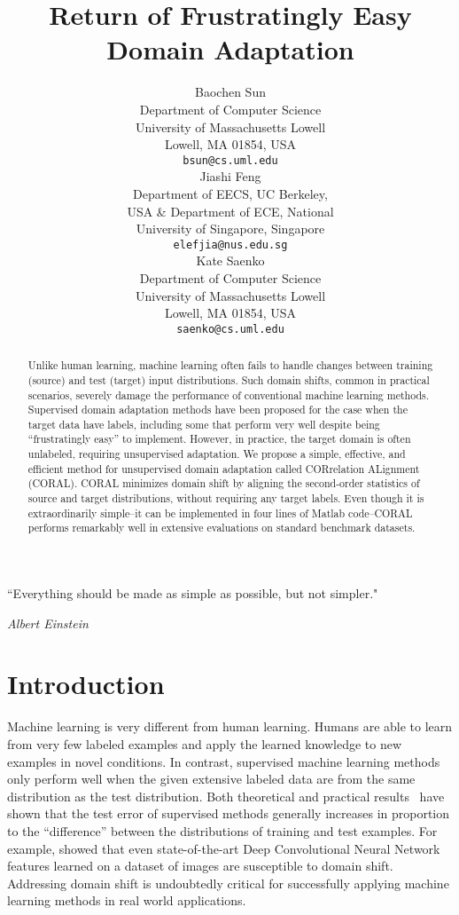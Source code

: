 \documentclass[letterpaper]{article}
\title{Return of Frustratingly Easy Domain Adaptation}
\author{
Baochen Sun\\
Department of Computer Science\\
University of Massachusetts Lowell\\
Lowell, MA 01854, USA \\
\texttt{bsun@cs.uml.edu} \\
\And
Jiashi Feng\\
Department of EECS, UC Berkeley,\\
USA \& Department of ECE, National\\
University of Singapore,  Singapore\\
\texttt{elefjia@nus.edu.sg} \\
\And
Kate Saenko\\
Department of Computer Science\\
University of Massachusetts Lowell\\
Lowell, MA 01854, USA \\
\texttt{saenko@cs.uml.edu} \\
}
\begin{document}
\nocopyright \frenchspacing
\maketitle

\begin{abstract}
Unlike human learning, machine learning often fails to handle changes between training (source) and test (target) input distributions. Such domain shifts, common in practical scenarios, severely damage the performance of conventional machine learning methods. 
Supervised domain adaptation methods have been proposed for the case when the target data have labels, including some that perform very well despite being ``frustratingly easy'' to implement. However, in practice, the target domain is often unlabeled, requiring unsupervised adaptation.
We propose a simple, effective, and efficient method for unsupervised domain adaptation called CORrelation ALignment (CORAL). CORAL minimizes domain shift by aligning the second-order statistics of source and target distributions, without requiring any target labels. 
Even though it is extraordinarily simple--it can be implemented in four lines of Matlab code--CORAL performs remarkably well in extensive evaluations on standard benchmark datasets.
\end{abstract}

\epigraph{``Everything should be made as simple as possible, but not simpler."}{\textit{Albert Einstein}}
\section{Introduction}
\label{sec:intro}
Machine learning is very different from human learning. Humans are able to learn from very few labeled examples and apply the learned knowledge to new examples in novel conditions. In contrast, supervised machine learning methods only perform well when the given extensive labeled data are from the same distribution as the test distribution. Both theoretical \cite{bendavid,Blitzer07Biographies} and practical results~\cite{saenko2010adapting,efros-cvpr11} have shown that the test error of supervised methods generally increases in proportion to the ``difference'' between the distributions of training and test examples. For example, \citeauthor{decaf}  showed that even state-of-the-art Deep Convolutional Neural Network features learned on a  dataset of  images are susceptible to domain shift.
Addressing domain shift is undoubtedly critical for successfully applying machine learning methods in real world applications.
\end{document}
